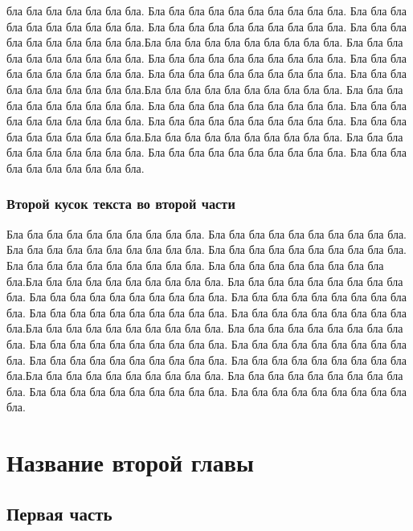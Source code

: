 \documentclass[12pt,a4paper, oneside]{report}
\begin{document}
бла бла бла бла бла бла бла. Бла бла бла бла бла бла бла бла бла бла. Бла бла бла бла бла бла бла бла бла бла. Бла бла бла бла бла бла бла бла бла бла. Бла бла бла бла бла бла бла бла бла бла.Бла бла бла бла бла бла бла бла бла бла. Бла бла бла бла бла бла бла бла бла бла. Бла бла бла бла бла бла бла бла бла бла. Бла бла бла бла бла бла бла бла бла бла. Бла бла бла бла бла бла бла бла бла бла. Бла бла бла бла бла бла бла бла бла бла.Бла бла бла бла бла бла бла бла бла бла. Бла бла бла бла бла бла бла бла бла бла. Бла бла бла бла бла бла бла бла бла бла. Бла бла бла бла бла бла бла бла бла бла. Бла бла бла бла бла бла бла бла бла бла. Бла бла бла бла бла бла бла бла бла бла.Бла бла бла бла бла бла бла бла бла бла. Бла бла бла бла бла бла бла бла бла бла. Бла бла бла бла бла бла бла бла бла бла. Бла бла бла бла бла бла бла бла бла бла.

\subsection{Второй кусок текста во второй части}
Бла бла бла бла бла бла бла бла бла бла. Бла бла бла бла бла бла бла бла бла бла. Бла бла бла бла бла бла бла бла бла бла. Бла бла бла бла бла бла бла бла бла бла. Бла бла бла бла бла бла бла бла бла бла. Бла бла бла бла бла бла бла бла бла бла.Бла бла бла бла бла бла бла бла бла бла. Бла бла бла бла бла бла бла бла бла бла. Бла бла бла бла бла бла бла бла бла бла. Бла бла бла бла бла бла бла бла бла бла. Бла бла бла бла бла бла бла бла бла бла. Бла бла бла бла бла бла бла бла бла бла.Бла бла бла бла бла бла бла бла бла бла. Бла бла бла бла бла бла бла бла бла бла. Бла бла бла бла бла бла бла бла бла бла. Бла бла бла бла бла бла бла бла бла бла. Бла бла бла бла бла бла бла бла бла бла. Бла бла бла бла бла бла бла бла бла бла.Бла бла бла бла бла бла бла бла бла бла. Бла бла бла бла бла бла бла бла бла бла. Бла бла бла бла бла бла бла бла бла бла. Бла бла бла бла бла бла бла бла бла бла.



\chapter{Название второй главы}

\section{Первая часть}
\end{document}
